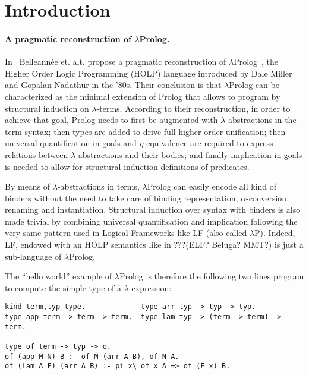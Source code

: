 \documentclass{easychair}
\begin{document}
\section{Introduction}\label{sec:introduction}

\paragraph{A pragmatic reconstruction of $\lambda$Prolog.}

In~\cite{jlp98} Belleannée et. alt. propose a pragmatic reconstruction
of $\lambda$Prolog~\cite{lambdap1,lambdap2,lambdap3}, the Higher Order
Logic Programming (HOLP) language introduced by Dale Miller and
Gopalan Nadathur in the '80s.
Their conclusion is that $\lambda$Prolog can be characterized as the
minimal extension of Prolog that allows to program by structural
induction on $\lambda$-terms. According to their reconstruction, in
order to achieve that goal, Prolog needs to first be augmented with
$\lambda$-abstractions in the term syntax; then types are added to
drive full higher-order unification; then universal quantification in
goals and $\eta$-equivalence are required to express relations between
$\lambda$-abstractions and their bodies; and finally implication in
goals is needed to allow for structural induction definitions of
predicates.

By means of $\lambda$-abstractions in terms, $\lambda$Prolog can
easily encode all kind of binders without the need to take care of
binding representation, $\alpha$-conversion, renaming and
instantiation. Structural induction over syntax with binders is also
made trivial by combining universal quantification and implication
following the very same pattern used in Logical Frameworks like LF
(also called $\lambda$P). Indeed, LF, endowed with an HOLP semantics
like in ???(ELF? Beluga? MMT?) is just a sub-language of
$\lambda$Prolog.

The ``hello world'' example of $\lambda$Prolog is therefore the
following two lines program to compute the simple type of a
$\lambda$-expression:

\begin{Verbatim}
kind term,typ type.             type arr typ -> typ -> typ.
type app term -> term -> term.  type lam typ -> (term -> term) -> term.

type of term -> typ -> o.
of (app M N) B :- of M (arr A B), of N A.
of (lam A F) (arr A B) :- pi x\ of x A => of (F x) B.
\end{Verbatim}
\end{document}
